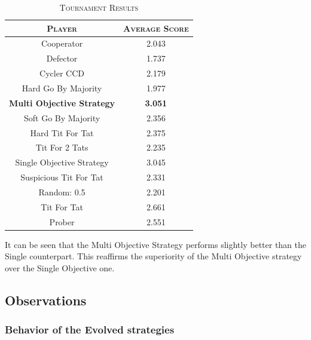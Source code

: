 \documentclass[a4paper]{article}
\begin{document}
	\begin{table}[H]
	  \begin{center}
	    \begin{tabular}{c|c}
	      \toprule
	      \textsc{Player} & \textsc{Average Score}\\
	      \midrule
			Cooperator & 2.043\\
			Defector & 1.737\\
			Cycler CCD & 2.179\\
			Hard Go By Majority & 1.977\\
			\textbf{Multi Objective Strategy} & \textbf{3.051}\\
			Soft Go By Majority & 2.356\\
			Hard Tit For Tat & 2.375\\
			Tit For 2 Tats & 2.235\\
			{Single Objective Strategy} & {3.045}\\
			Suspicious Tit For Tat & 2.331\\
			Random: 0.5 & 2.201\\
			Tit For Tat & 2.661\\
			Prober & 2.551\\
		  \bottomrule
	    \end{tabular}
	    \caption{\textsc{Tournament Results}}
	  \end{center}
	\end{table}  

	It can be seen that the Multi Objective Strategy performs slightly better than the Single counterpart. This reaffirms the superiority of the Multi Objective strategy over the Single Objective one.
	
	\subsection{Observations}
	
	\subsubsection{Behavior of the Evolved strategies}
\end{document}
